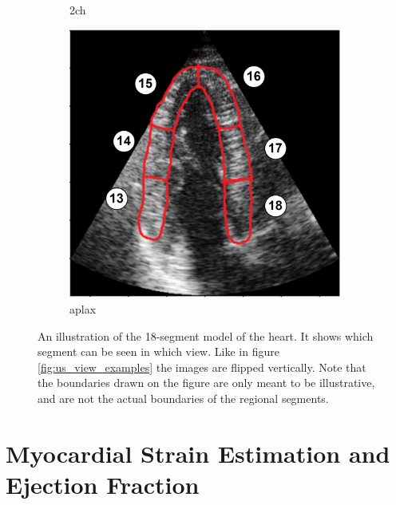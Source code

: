 \begin{figure}[H]
\begin{subfigure}[b]{0.3\textwidth}
        \caption{\acrshort{2ch}}
        \label{fig:18_segment_model_2ch}
    \end{subfigure}
    \begin{subfigure}[b]{0.3\textwidth}
        \includegraphics[width=0.99\textwidth]{echocardiography/aplax_frame_segmented.png}
        \caption{\acrshort{aplax}}
        \label{fig:18_segment_model_aplax}
    \end{subfigure}
    \caption{An illustration of the 18-segment model of the heart. It shows which segment can be seen in which view. Like in figure \ref{fig:us_view_examples} the images are flipped vertically. Note that the boundaries drawn on the figure are only meant to be illustrative, and are not the actual boundaries of the regional segments.}
    \label{fig:18_segment_model}
\end{figure}

\section{Myocardial Strain Estimation and Ejection Fraction} \label{sec:strain_est}

